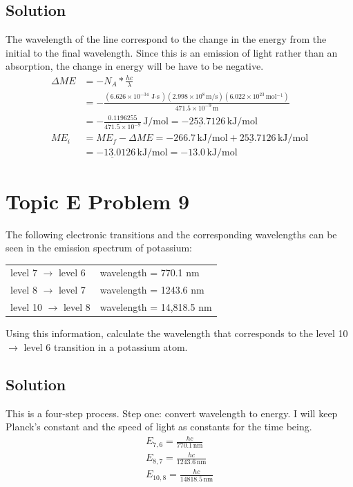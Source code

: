 \documentclass[10pt]{article}
\newcommand{\E}[1]{\times 10^{#1}}
\newcommand{\U}[1]{\underline{#1}}
\begin{document}
        \subsection{Solution}
            The wavelength of the line correspond to the change in the energy from the initial to the final wavelength.
            Since this is an emission of light rather than an absorption, the change in energy will be have to be negative.
            \begin{align}
                \Delta ME   &=  -N_A * \frac{hc}{\lambda}\\
                    &=  -\frac{(6.626\E{-34}\,\unit{\joule\cdot\second})(2.998\E{8}\,\unit{\meter/\second})(6.022\E{23}\,\unit{\mol^{-1}})}{471.5\E{-9}\,\unit{\meter}}\\
                    &=  -\frac{0.\U{1196}255}{471.5\E{-9}}\,\unit{\joule/\mole}
                    =   -\U{253.7}126\,\unit{\kilo\joule/\mole}\\
                ME_i    &=  ME_f - \Delta ME
                    =   -266.7\,\unit{\kilo\joule/\mole} + \U{253.7}126\,\unit{\kilo\joule/\mole}\\
                    &=  -\U{13.0}126\,\unit{\kilo\joule/\mole}
                    =   \boxed{-13.0\,\unit{\kilo\joule/\mole}}
            \end{align}


    \pagebreak
    \section{Topic E Problem 9}
        The following electronic transitions and the corresponding wavelengths can be seen in the emission spectrum of potassium:
        \begin{center}
            \begin{tabular}{l l}
                level 7 $\rightarrow$ level 6   &wavelength = 770.1 nm\\
                level 8 $\rightarrow$ level 7   &wavelength = 1243.6 nm\\
                level 10 $\rightarrow$ level 8  &wavelength = 14,818.5 nm
            \end{tabular}
        \end{center}
        Using this information, calculate the wavelength that corresponds to the level 10 $\rightarrow$ level 6 transition in a potassium atom.

        \subsection{Solution}
            This is a four-step process. 
            Step one: convert wavelength to energy.
            I will keep Planck's constant and the speed of light as constants for the time being.
            \begin{gather}
                E_{7,6} =   \frac{hc}{770.1\,\unit{\nano\meter}}\\
                E_{8,7} =   \frac{hc}{1243.6\,\unit{\nano\meter}}\\
                E_{10,8}=   \frac{hc}{14818.5\,\unit{\nano\meter}}
            \end{gather}
\end{document}

